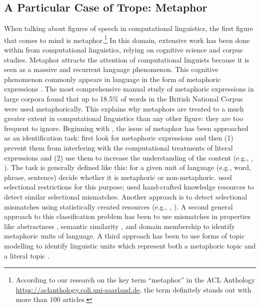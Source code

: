 \subsection{A Particular Case of Trope: Metaphor}
When talking about figures of speech in computational linguistics, the first figure that comes to mind is metaphor.\footnote{According to our research on the key term ``metaphor'' in the ACL Anthology \url{https://aclanthology.coli.uni-saarland.de}, the term definitely stands out with more than 100 articles.}
In this domain, extensive work has been done within from computational linguistics, relying on cognitive science and corpus studies. Metaphor  attracts the attention of computational linguists because it is seen as a massive and recurrent language phenomenon. This cognitive phenomenon \citep{LakoffJohnson80} 
 commonly appears in language in the form of metaphoric expressions  \citep{Deignan2005}. The most comprehensive manual study of metaphoric expressions in large corpora \citep{Steen2010} found that up to 18.5\% of words in the British National Corpus were used metaphorically. This explains why metaphors are treated to a much greater extent in computational linguistics than any other figure: they are too frequent to ignore. 
Beginning with \cite{Wilks1978}, the issue of metaphor has been approached as an identification task: first look for metaphoric expressions and then (1) prevent them from interfering with the computational treatments of literal expressions and (2) use them to increase the understanding of the content %
%
(e.g., \citet{Carbonell1980}, \citet{Neuman2009}). %
The task is generally defined like this: for a given unit of language (e.g., word, phrase, sentence) decide whether it is metaphoric or non-metaphoric. \citet{Neuman2009} used selectional restrictions for this purpose; \cite{Mason2004} used hand-crafted knowledge resources to detect similar selectional mismatches. Another approach is to detect selectional mismatches using statistically created resources (e.g., \citet{Shutova2013a}, \citet{Shutova2013}). A second general approach to this classification problem has been to use mismatches in properties like abstractness \citep{Gandy2013,Assaf2013,Tsvetkov2013,Turney2011}, semantic similarity \citep{Li2010a,Li2010}, and domain membership \citep{Dunn2013a,Dunn2013} to identify metaphoric units of language. A third approach has been to use forms of topic modelling to identify linguistic units which represent both a metaphoric topic and a literal topic \citep{Bracewell2013}. %

